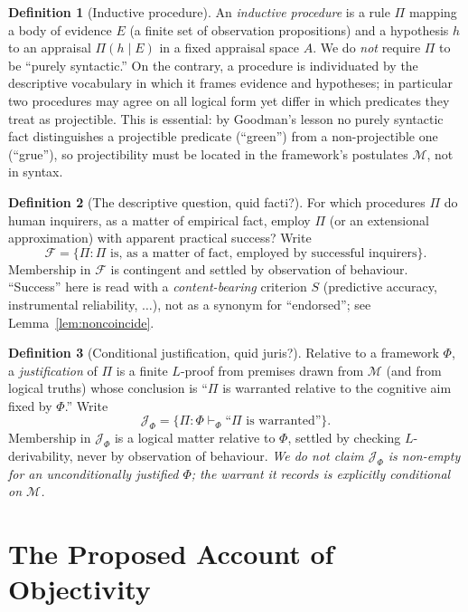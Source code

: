 \documentclass{amsart}
\theoremstyle{definition}
\newtheorem{definition}{Definition}
\theoremstyle{plain}
\theoremstyle{remark}
\begin{document}
\begin{definition}[Inductive procedure]\label{def:procedure}
An \emph{inductive procedure} is a rule $\Pi$ mapping a body of evidence $E$
(a finite set of observation propositions) and a hypothesis $h$ to an appraisal
$\Pi(h\mid E)$ in a fixed appraisal space $A$. We do \emph{not} require $\Pi$
to be ``purely syntactic.'' On the contrary, a procedure is individuated by the
descriptive vocabulary in which it frames evidence and hypotheses; in
particular two procedures may agree on all logical form yet differ in which
predicates they treat as projectible. This is essential: by Goodman's lesson
no purely syntactic fact distinguishes a projectible predicate (``green'')
from a non-projectible one (``grue''), so projectibility must be located in the
framework's postulates $\mathcal{M}$, not in syntax.
\end{definition}

\begin{definition}[The descriptive question, quid facti?]\label{def:facti}
For which procedures $\Pi$ do human inquirers, as a matter of empirical fact,
employ $\Pi$ (or an extensional approximation) with apparent practical success?
Write
\[
\mathcal{F}=\{\Pi:\Pi\text{ is, as a matter of fact, employed by successful
inquirers}\}.
\]
Membership in $\mathcal{F}$ is contingent and settled by observation of
behaviour. ``Success'' here is read with a \emph{content-bearing} criterion $S$
(predictive accuracy, instrumental reliability, $\dots$), not as a synonym for
``endorsed''; see Lemma~\ref{lem:noncoincide}.
\end{definition}

\begin{definition}[Conditional justification, quid juris?]\label{def:juris}
Relative to a framework $\Phi$, a \emph{justification} of $\Pi$ is a finite
$L$-proof from premises drawn from $\mathcal{M}$ (and from logical truths)
whose conclusion is ``$\Pi$ is warranted relative to the cognitive aim fixed by
$\Phi$.'' Write
\[
\mathcal{J}_\Phi=\{\Pi:\Phi\vdash_\Phi\text{``}\Pi\text{ is warranted''}\}.
\]
Membership in $\mathcal{J}_\Phi$ is a logical matter relative to $\Phi$,
settled by checking $L$-derivability, never by observation of behaviour.
\emph{We do not claim $\mathcal{J}_\Phi$ is non-empty for an unconditionally
justified $\Phi$; the warrant it records is explicitly conditional on
$\mathcal{M}$.}
\end{definition}

\section{The Proposed Account of Objectivity}
\end{document}

